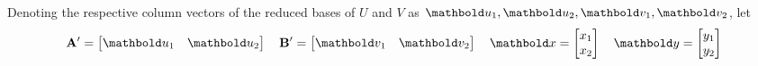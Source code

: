\documentclass[11pt]{article}
\begin{document}
\begin{enumerate}
          Denoting the respective column vectors of the reduced bases of $U$ and $V$ as
          $\vect{u}_1, \vect{u}_2, \vect{v}_1, \vect{v}_2$, let
          \[
              \mat{A}' = \begin{bmatrix}\vect{u}_1 & \vect{u}_2\end{bmatrix}
              \quad
              \mat{B}' = \begin{bmatrix}\vect{v}_1 & \vect{v}_2\end{bmatrix}
              \quad
              \vect{x} = \begin{bmatrix}x_1 \\ x_2\end{bmatrix}
              \quad
              \vect{y} = \begin{bmatrix}y_1 \\ y_2\end{bmatrix}
          \]


\end{enumerate}
\end{document}
